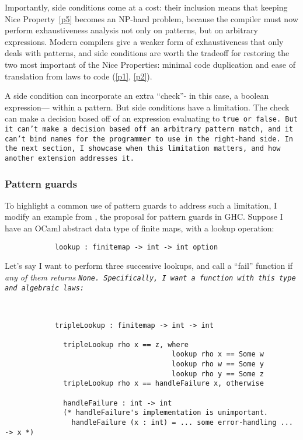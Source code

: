 \documentclass[manuscript,screen,review, 12pt, nonacm]{acmart}
\begin{document}
    Importantly, side conditions come at a cost: their inclusion means that
    keeping Nice Property~\ref{p5} becomes an NP-hard problem, because the
    compiler must now perform exhaustiveness analysis not only on patterns, but
    on arbitrary expressions. Modern compilers give a weaker form of
    exhaustiveness that only deals with patterns, and side conditions are worth
    the tradeoff for restoring the two most important of the Nice Properties:
    minimal code duplication and ease of translation from laws to code
    (\ref{p1}, \ref{p2}).

    A side condition can incorporate an extra “check”- in this case, a boolean
    expression--- within a pattern. But side conditions have a limitation. The
    check can make a decision based off of an expression evaluating to \tt{true}
    or \tt{false}. But it can't make a decision based off an arbitrary pattern
    match, and it can't bind names for the programmer to use in the right-hand
    side. In the next section, I showcase when this limitation matters, and how
    another extension addresses it. 

    \subsubsection{Pattern guards}
    \label{guards}

    To highlight a common use of pattern guards to address such a limitation, I
    modify an example from \citet{guardproposal}, the proposal for pattern
    guards in GHC. Suppose I have an OCaml abstract data type of finite maps,
    with a lookup operation: 

    \begin{minipage}[t]{\textwidth}
        \centering 
        \begin{verbatim}
            lookup : finitemap -> int -> int option
        \end{verbatim}
    \end{minipage}
    Let's say I want to perform three successive lookups, and call a “fail”
    function if \it{any} of them returns \tt{None}. Specifically, I want a
    function with this type and algebraic laws: 

    \begin{minipage}[t]{\textwidth}
        \centering 
        \begin{verbatim}
          

            tripleLookup : finitemap -> int -> int

              tripleLookup rho x == z, where 
                                        lookup rho x == Some w
                                        lookup rho w == Some y
                                        lookup rho y == Some z
              tripleLookup rho x == handleFailure x, otherwise
            
              handleFailure : int -> int 
              (* handleFailure's implementation is unimportant.
                handleFailure (x : int) = ... some error-handling ... -> x *)  

        \end{verbatim}
    \end{minipage}
\end{document}
